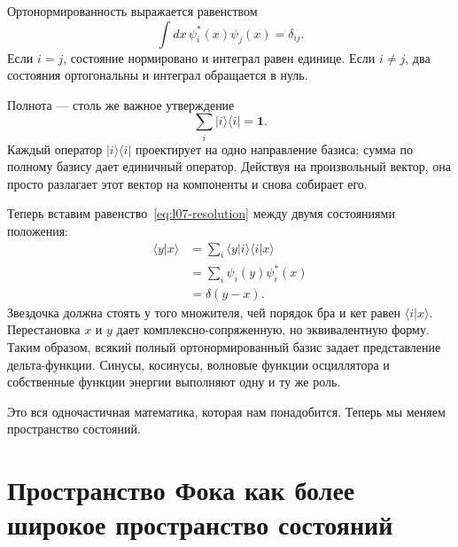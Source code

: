 Ортонормированность выражается равенством
\begin{equation}
\int dx\,\psi_i^*(x)\psi_j(x)=\delta_{ij}.
\label{eq:l07-orthonormality}
\end{equation}
Если \(i=j\), состояние нормировано и интеграл равен единице. Если \(i\ne j\), два состояния ортогональны и интеграл обращается в нуль.

Полнота — столь же важное утверждение
\begin{equation}
\sum_i |i\rangle\langle i|=\mathbf 1.
\label{eq:l07-resolution}
\end{equation}
Каждый оператор \(|i\rangle\langle i|\) проектирует на одно направление базиса; сумма по полному базису дает единичный оператор. Действуя на произвольный вектор, она просто разлагает этот вектор на компоненты и снова собирает его.

Теперь вставим равенство~\eqref{eq:l07-resolution} между двумя состояниями положения:
\begin{align}
\langle y|x\rangle
&=\sum_i\langle y|i\rangle\langle i|x\rangle \\
&=\sum_i\psi_i(y)\psi_i^*(x) \\
&=\delta(y-x).
\label{eq:l07-position-completeness}
\end{align}
Звездочка должна стоять у того множителя, чей порядок бра и кет равен \(\langle i|x\rangle\). Перестановка \(x\) и \(y\) дает комплексно-сопряженную, но эквивалентную форму. Таким образом, всякий полный ортонормированный базис задает представление дельта-функции. Синусы, косинусы, волновые функции осциллятора и собственные функции энергии выполняют одну и ту же роль.

\begin{classroomqa}
\end{classroomqa}

Это вся одночастичная математика, которая нам понадобится. Теперь мы меняем пространство состояний.

\section{Пространство Фока как более широкое пространство состояний}

